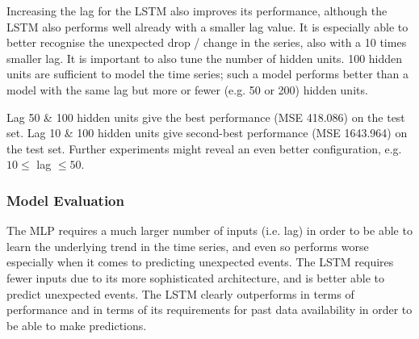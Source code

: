 Increasing the lag for the LSTM also improves its performance, although the LSTM also performs well already with a smaller lag value.
It is especially able to better recognise the unexpected drop / change in the series, also with a 10 times smaller lag.
It is important to also tune the number of hidden units.
100 hidden units are sufficient to model the time series; such a model performs better than a model with the same lag but more or fewer (e.g. 50 or 200) hidden units.

Lag 50 \& 100 hidden units give the best performance (MSE 418.086) on the test set.
Lag 10 \& 100 hidden units give second-best performance (MSE 1643.964) on the test set.
Further experiments might reveal an even better configuration, e.g. $10 \leq$ lag $\leq 50$.

\subsubsection{Model Evaluation}

The MLP requires a much larger number of inputs (i.e. lag) in order to be able to learn the underlying trend in the time series,
and even so performs worse especially when it comes to predicting unexpected events.
The LSTM requires fewer inputs due to its more sophisticated architecture, and is better able to predict unexpected events.
The LSTM clearly outperforms in terms of performance and in terms of its requirements for past data availability in order to be able to make predictions.

